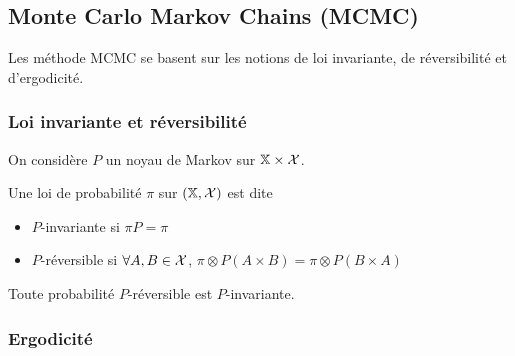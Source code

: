 \documentclass[10pt,a4paper]{article}
\begin{document}
\subsection{Monte Carlo Markov Chains (MCMC)}
Les méthode MCMC se basent sur les notions de loi invariante, de réversibilité et d'ergodicité.
\subsubsection{Loi invariante et réversibilité}
On considère $P$ un noyau de Markov sur $\mathbb{X} \times \mathcal{X}$.
\begin{Def}
  Une loi de probabilité $\pi$ sur $(\mathbb{X}, \mathcal{X})$ est dite
  \begin{itemize}
  \item $P$-invariante si $\pi P = \pi$
  \item $P$-réversible si $\forall A,B \in \mathcal{X}$, $\pi \otimes P (A \times B) = \pi \otimes P (B \times A)$
\end{itemize}
\end{Def}

\begin{Prop}
  Toute probabilité $P$-réversible est $P$-invariante.
\end{Prop}

\subsubsection{Ergodicité}
\end{document}

